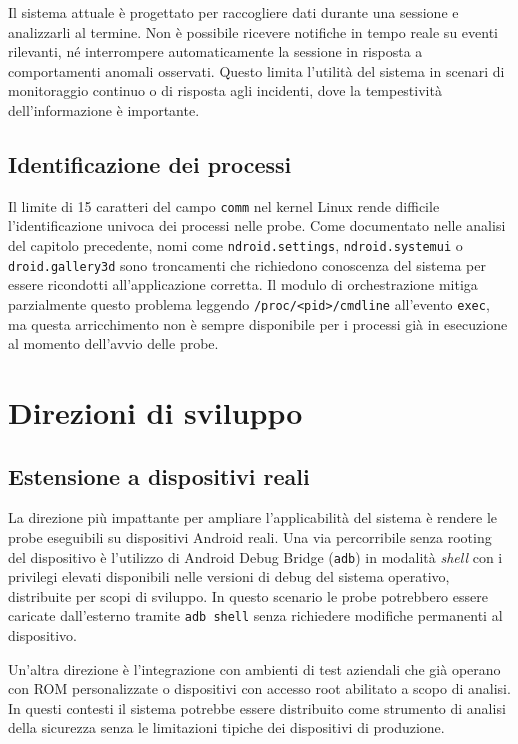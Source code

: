 Il sistema attuale è progettato per raccogliere dati durante una sessione e analizzarli al termine. Non è possibile ricevere notifiche in tempo reale su eventi rilevanti, né interrompere automaticamente la sessione in risposta a comportamenti anomali osservati. Questo limita l'utilità del sistema in scenari di monitoraggio continuo o di risposta agli incidenti, dove la tempestività dell'informazione è importante.

\subsection{Identificazione dei processi}

Il limite di 15 caratteri del campo \texttt{comm} nel kernel Linux rende difficile l'identificazione univoca dei processi nelle probe. Come documentato nelle analisi del capitolo precedente, nomi come \texttt{ndroid.settings}, \texttt{ndroid.systemui} o \texttt{droid.gallery3d} sono troncamenti che richiedono conoscenza del sistema per essere ricondotti all'applicazione corretta. Il modulo di orchestrazione mitiga parzialmente questo problema leggendo \texttt{/proc/<pid>/cmdline} all'evento \texttt{exec}, ma questa arricchimento non è sempre disponibile per i processi già in esecuzione al momento dell'avvio delle probe.

\section{Direzioni di sviluppo}

\subsection{Estensione a dispositivi reali}

La direzione più impattante per ampliare l'applicabilità del sistema è rendere le probe eseguibili su dispositivi Android reali. Una via percorribile senza rooting del dispositivo è l'utilizzo di Android Debug Bridge (\texttt{adb}) in modalità \textit{shell} con i privilegi elevati disponibili nelle versioni di debug del sistema operativo, distribuite per scopi di sviluppo. In questo scenario le probe potrebbero essere caricate dall'esterno tramite \texttt{adb shell} senza richiedere modifiche permanenti al dispositivo.

Un'altra direzione è l'integrazione con ambienti di test aziendali che già operano con ROM personalizzate o dispositivi con accesso root abilitato a scopo di analisi. In questi contesti il sistema potrebbe essere distribuito come strumento di analisi della sicurezza senza le limitazioni tipiche dei dispositivi di produzione.

